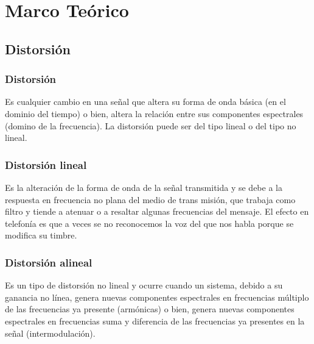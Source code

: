 \documentclass{article}
\author{Pablo Vivar Colina}
\begin{document}
\tableofcontents  %

\listoffigures  %


\section{Marco Teórico}

\subsection{Distorsión}

\subsubsection{Distorsión}

Es cualquier cambio en una señal que altera su forma de onda básica (en el dominio del  tiempo)  o  bien,  altera  la  relación  entre  sus  componentes  espectrales  (domino  de  la  frecuencia).  La distorsión puede ser del tipo lineal o del tipo no lineal.\citep{Distorsion}


\subsubsection{Distorsión lineal}

Es la alteración de la forma de onda de la señal 
transmitida y se debe a la 
respuesta en frecuencia no plana del medio de trans
misión, que trabaja como filtro y tiende a atenuar 
o a resaltar algunas frecuencias del mensaje. El efecto en telefonía es que a veces se no reconocemos la voz del 
que nos habla porque se modifica su timbre.\citep{Distorsion} 

\subsubsection{Distorsión alineal}

Es un tipo de distorsión no lineal y ocurre cuando un sistema, debido a su ganancia  no línea,  genera  nuevas  componentes  espectrales  en  frecuencias  múltiplo  de  las  frecuencias  ya presente (armónicas) o bien, genera nuevas componentes espectrales en frecuencias suma y diferencia de las  frecuencias  ya  presentes  en  la  señal  (intermodulación).\citep{Distorsion}

\end{document}
